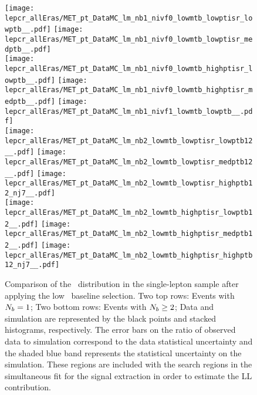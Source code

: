 \begin{figure}[!htb]
	\begin{center}  
		\texttt{[image: lepcr\_allEras/MET\_pt\_DataMC\_lm\_nb1\_nivf0\_lowmtb\_lowptisr\_lowptb\_\_.pdf]}
		\texttt{[image: lepcr\_allEras/MET\_pt\_DataMC\_lm\_nb1\_nivf0\_lowmtb\_lowptisr\_medptb\_\_.pdf]} \\
		\texttt{[image: lepcr\_allEras/MET\_pt\_DataMC\_lm\_nb1\_nivf0\_lowmtb\_highptisr\_lowptb\_\_.pdf]}
		\texttt{[image: lepcr\_allEras/MET\_pt\_DataMC\_lm\_nb1\_nivf0\_lowmtb\_highptisr\_medptb\_\_.pdf]}
		\texttt{[image: lepcr\_allEras/MET\_pt\_DataMC\_lm\_nb1\_nivf1\_lowmtb\_lowptb\_\_.pdf]} \\
		\texttt{[image: lepcr\_allEras/MET\_pt\_DataMC\_lm\_nb2\_lowmtb\_lowptisr\_lowptb12\_\_.pdf]} 
		\texttt{[image: lepcr\_allEras/MET\_pt\_DataMC\_lm\_nb2\_lowmtb\_lowptisr\_medptb12\_\_.pdf]}
		\texttt{[image: lepcr\_allEras/MET\_pt\_DataMC\_lm\_nb2\_lowmtb\_lowptisr\_highptb12\_nj7\_\_.pdf]} \\
		\texttt{[image: lepcr\_allEras/MET\_pt\_DataMC\_lm\_nb2\_lowmtb\_highptisr\_lowptb12\_\_.pdf]} 
		\texttt{[image: lepcr\_allEras/MET\_pt\_DataMC\_lm\_nb2\_lowmtb\_highptisr\_medptb12\_\_.pdf]}
		\texttt{[image: lepcr\_allEras/MET\_pt\_DataMC\_lm\_nb2\_lowmtb\_highptisr\_highptb12\_nj7\_\_.pdf]} \\
	\end{center}
	\caption[Lost Lepton LM Control Region $\nb=1$]{Comparison of the \met~distribution in the single-lepton sample after applying the low \dm~baseline selection. Two top rows: Events with $\nb=1$; Two bottom rows: Events with $N_{b} \geq2$;  Data and simulation are represented by the black points and stacked histograms, respectively. The error bars on the ratio of observed data to simulation correspond to the data statistical uncertainty and the shaded blue band represents the statistical uncertainty on the simulation. These regions are included with the search regions in the simultaneous fit for the signal extraction in order to estimate the LL contribution.
	 }
	\label{fig:llb-1lcr-datavsmc-lm-nb1}
\end{figure}
